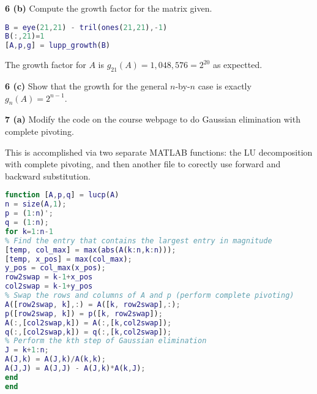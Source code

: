 \documentclass[12pt]{article}
\newcommand{\problem}[1]{\hspace{-4 ex} \large \textbf{#1}}
\begin{document}
\problem{6 (b)} Compute the growth factor for the matrix given.
	
	\begin{lstlisting}[language=matlab]
B = eye(21,21) - tril(ones(21,21),-1)
B(:,21)=1
[A,p,g] = lupp_growth(B)
	\end{lstlisting}
	
	The growth factor for $A$ is $g_21(A)=1,048,576 = 2^{20}$ as expectted.
	
\problem{6 (c)} Show that the growth for the general $n$-by-$n$ case is exactly $g_n(A)=2^{n-1}$.

\problem{7 (a)} Modify the code on the course webpage to do Gaussian elimination with complete pivoting.

	This is accomplished via two separate MATLAB functions: the LU decomposition with complete pivoting, and then another file to corectly use forward and backward substitution.
	\begin{lstlisting}[language=matlab]
function [A,p,q] = lucp(A)
n = size(A,1);
p = (1:n)';
q = (1:n);
for k=1:n-1
% Find the entry that contains the largest entry in magnitude
[temp, col_max] = max(abs(A(k:n,k:n)));
[temp, x_pos] = max(col_max);
y_pos = col_max(x_pos);
row2swap = k-1+x_pos
col2swap = k-1+y_pos
% Swap the rows and columns of A and p (perform complete pivoting)
A([row2swap, k],:) = A([k, row2swap],:);
p([row2swap, k]) = p([k, row2swap]);
A(:,[col2swap,k]) = A(:,[k,col2swap]);
q(:,[col2swap,k]) = q(:,[k,col2swap]);
% Perform the kth step of Gaussian elimination
J = k+1:n;
A(J,k) = A(J,k)/A(k,k);
A(J,J) = A(J,J) - A(J,k)*A(k,J);
end
end


	\end{lstlisting}
\end{document}
